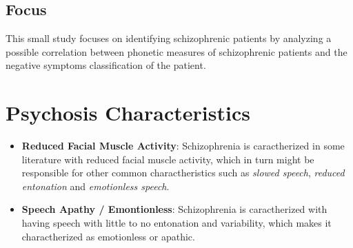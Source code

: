 \documentclass{Paper_Summary}
\begin{document}
\makepapertitle

\breakline

\begin{center}
    \section*{Focus}
\end{center}
    
    This small study focuses on identifying schizophrenic patients by analyzing a possible correlation between phonetic measures of schizophrenic patients and the negative symptoms classification of the patient.

\breakline

\newpage

\section{Psychosis Characteristics}
    \begin{itemize}
        \item \textbf{Reduced Facial Muscle Activity}: Schizophrenia is caractherized in some literature with reduced facial muscle activity, which in turn might be responsible for other common charactheristics such as \emph{slowed speech}, \emph{reduced entonation} and \emph{emotionless speech}.
        \item \textbf{Speech Apathy / Emontionless}: Schizophrenia is caractherized with having speech with little to no entonation and variability, which makes it charactherized as emotionless or apathic.
    \end{itemize}
\end{document}

